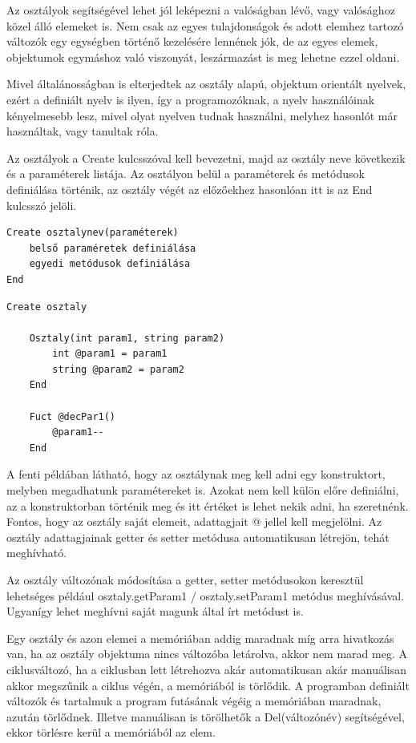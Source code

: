Az osztályok segítségével lehet jól leképezni a valóságban lévő, vagy valósághoz közel álló elemeket is. Nem csak az egyes tulajdonságok és adott elemhez tartozó változók egy egységben történő kezelésére lennének jók, de az egyes elemek, objektumok egymáshoz való viszonyát, leszármazást is meg lehetne ezzel oldani.

Mivel általánosságban is elterjedtek az osztály alapú, objektum orientált nyelvek, ezért a definiált nyelv is ilyen, így a programozóknak, a nyelv használóinak kényelmesebb lesz, mivel olyat nyelven tudnak használni, melyhez hasonlót már használtak, vagy tanultak róla.

Az osztályok a Create kulcsszóval kell bevezetni, majd az osztály neve következik és a paraméterek listája. Az osztályon belül a paraméterek és metódusok definiálása történik, az osztály végét az előzőekhez hasonlóan itt is az End kulcsszó jelöli.

\begin{verbatim}
Create osztalynev(paraméterek)
	belső paraméretek definiálása
	egyedi metódusok definiálása
End
\end{verbatim}

\begin{verbatim}
Create osztaly
	
	Osztaly(int param1, string param2)
		int @param1 = param1
		string @param2 = param2
	End
		
	Fuct @decPar1()
		@param1--
	End
\end{verbatim}

A fenti példában látható, hogy az osztálynak meg kell adni egy konstruktort, melyben megadhatunk paramétereket is. Azokat nem kell külön előre definiálni, az a konstruktorban történik meg és itt értéket is lehet nekik adni, ha szeretnénk. Fontos, hogy az osztály saját elemeit, adattagjait @ jellel kell megjelölni. Az osztály adattagjainak getter és setter metódusa automatikusan létrejön, tehát meghívható.

Az osztály változónak módosítása a getter, setter metódusokon keresztül lehetséges például osztaly.getParam1 / osztaly.setParam1 metódus meghívásával. Ugyanígy lehet meghívni saját magunk által írt metódust is.

Egy osztály és azon elemei a memóriában addig maradnak míg arra hivatkozás van, ha az osztály objektuma nincs változóba letárolva, akkor nem marad meg. A ciklusváltozó, ha a ciklusban lett létrehozva akár automatikusan akár manuálisan akkor megszűnik a ciklus végén, a memóriából is törlődik. A programban definiált változók és tartalmuk a program futásának végéig a memóriában maradnak, azután törlődnek. Illetve manuálisan is törölhetők a Del(változónév) segítségével, ekkor törlésre kerül a memóriából az elem.

